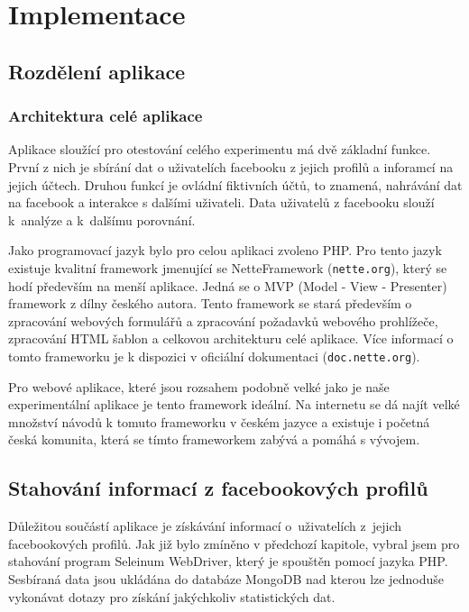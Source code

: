 \documentclass[thesis=M,czech]{FITthesis}[2013/05/10]
\begin{document}
\chapter{Implementace}

\section{Rozdělení aplikace}

\subsection{Architektura celé aplikace}

Aplikace sloužící pro otestování celého experimentu má dvě základní funkce. První z nich je sbírání dat o uživatelích facebooku z jejich profilů a inforamcí na jejich účtech. Druhou funkcí je ovládní fiktivních účtů, to znamená, nahrávání dat na facebook a interakce s dalšími uživateli. Data uživatelů z facebooku slouží k~analýze a k~dalšímu porovnání.

Jako programovací jazyk bylo pro celou aplikaci zvoleno PHP. Pro tento jazyk existuje kvalitní framework jmenující se NetteFramework (\verb|nette.org|), který se hodí především na menší aplikace. Jedná se o MVP (Model - View - Presenter) framework z dílny českého autora. Tento framework se stará především o zpracování webových formulářů a zpracování požadavků webového prohlížeče, zpracování HTML šablon a celkovou architekturu celé aplikace. Více informací o tomto frameworku je k dispozici v oficiální dokumentaci (\verb|doc.nette.org|). 

Pro webové aplikace, které jsou rozsahem podobně velké jako je naše experimentální aplikace je tento framework ideální. Na internetu se dá najít velké množství návodů k tomuto frameworku v českém jazyce a existuje i početná česká komunita, která se tímto frameworkem zabývá a pomáhá s vývojem. 


\section{Stahování informací z facebookových profilů}

Důležitou součástí aplikace je získávání informací o~uživatelích z~jejich facebookových profilů. Jak již bylo zmíněno v předchozí kapitole, vybral jsem pro stahování program Seleinum WebDriver, který je spouštěn pomocí jazyka PHP. Sesbíraná data jsou ukládána do databáze MongoDB nad kterou lze jednoduše vykonávat dotazy pro získání jakýchkoliv statistických dat.
\end{document}
